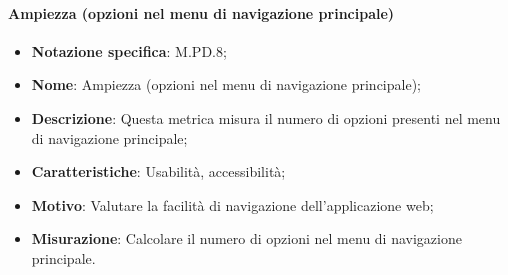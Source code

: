 \paragraph*{Ampiezza (opzioni nel menu di navigazione principale)}
\begin{itemize}
    \item \textbf{Notazione specifica}: M.PD.8;
    \item \textbf{Nome}: Ampiezza (opzioni nel menu di navigazione principale);
    \item \textbf{Descrizione}: Questa metrica misura il numero di opzioni presenti nel menu di navigazione principale;
    \item \textbf{Caratteristiche}: Usabilità, accessibilità;
    \item \textbf{Motivo}: Valutare la facilità di navigazione dell'applicazione web;
    \item \textbf{Misurazione}: Calcolare il numero di opzioni nel menu di navigazione principale.
\end{itemize}

